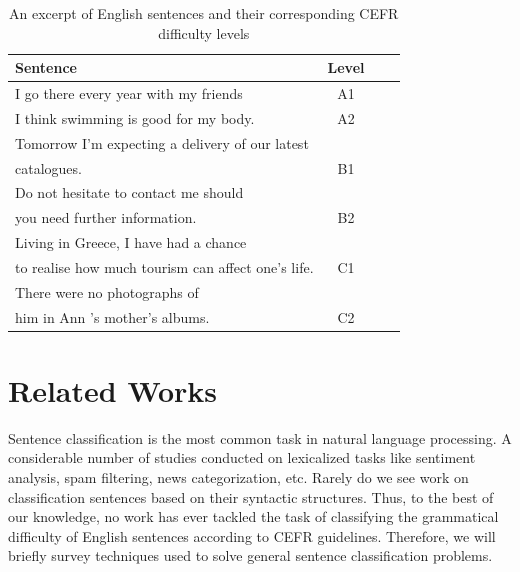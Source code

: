 \begin{table}
\caption{An excerpt of English sentences and their corresponding CEFR difficulty levels}
\centering
\begin{tabular}{l|c|c|c}
Sentence   & Level \\
\hline
I go there every year with my friends & A1 & \\
I think swimming is good for my body. & A2 & \\
Tomorrow I'm expecting a delivery of our latest\\ catalogues. & B1 & \\
Do not hesitate to contact me should \\you need further information. & B2 & \\
Living in Greece, I have had a chance \\to realise how much tourism can affect one's life. & C1 & \\
There were no photographs of \\him in Ann 's mother's albums. & C2 & \\
\end{tabular}
\label{tab:cefr}
\end{table}


\section{Related Works}
\label{sec:research_background}

Sentence classification is the most common task in natural language processing. A considerable number of studies conducted on lexicalized tasks like sentiment analysis, spam filtering, news categorization, etc. Rarely do we see work on classification sentences based on their syntactic structures. Thus, to the best of our knowledge, no work has ever tackled the task of classifying the grammatical difficulty of English sentences according to CEFR guidelines. Therefore, we will briefly survey techniques used to solve general sentence classification problems. 

